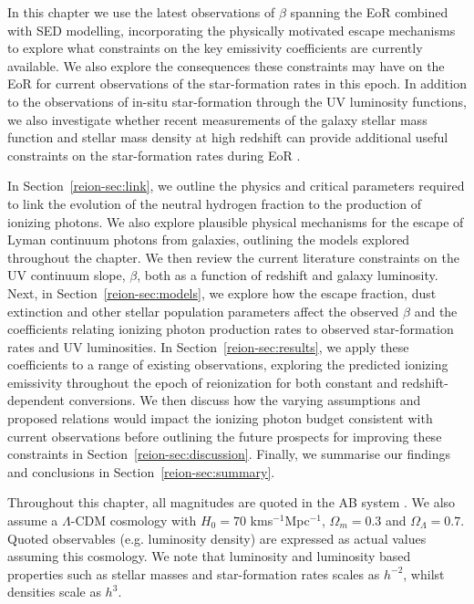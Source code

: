 In this chapter we use the latest observations of $\beta$ spanning the EoR combined with SED modelling, incorporating the physically motivated escape mechanisms to explore what constraints on the key emissivity coefficients are currently available. We also explore the consequences these constraints may have on the EoR for current observations of the star-formation rates in this epoch. In addition to the observations of in-situ star-formation through the UV luminosity functions, we also investigate whether recent measurements of the galaxy stellar mass function and stellar mass density at high redshift \citep{Duncan:2014gh,Grazian:2014vx} can provide additional useful constraints on the star-formation rates during EoR \citep{Stark:2007gi,Gonzalez:2010hm}.

In Section~\ref{reion-sec:link}, we outline the physics and critical parameters required to link the evolution of the neutral hydrogen fraction to the production of ionizing photons. We also explore plausible physical mechanisms for the escape of Lyman continuum photons from galaxies, outlining the models explored throughout the chapter. We then review the current literature constraints on the UV continuum slope, $\beta$, both as a function of redshift and galaxy luminosity. Next, in Section~\ref{reion-sec:models}, we explore how the escape fraction, dust extinction and other stellar population parameters affect the observed $\beta$ and the coefficients relating ionizing photon production rates to observed star-formation rates and UV luminosities. In Section~\ref{reion-sec:results}, we apply these coefficients to a range of existing observations, exploring the predicted ionizing emissivity throughout the epoch of reionization for both constant and redshift-dependent conversions. We then discuss how the varying assumptions and proposed relations would impact the ionizing photon budget consistent with current observations before outlining the future prospects for improving these constraints in Section~\ref{reion-sec:discussion}. Finally, we summarise our findings and conclusions in Section~\ref{reion-sec:summary}.

Throughout this chapter, all magnitudes are quoted in the AB system \citep{1983ApJ...266..713O}. We also assume a $\Lambda$-CDM cosmology with $H_{0} = 70$ kms$^{-1}$Mpc$^{-1}$, $\Omega_{m}=0.3$ and $\Omega_{\Lambda}=0.7$. Quoted observables (e.g. luminosity density) are expressed as actual values assuming this cosmology. We note that luminosity and luminosity based properties such as stellar masses and star-formation rates scales as $h^{-2}$, whilst densities scale as $h^{3}$.

